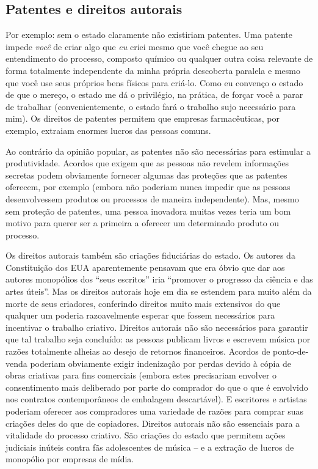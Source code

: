 \subsection*{Patentes e direitos autorais}

Por exemplo: sem o estado claramente não existiriam patentes. Uma patente impede \emph{você} de criar algo que \emph{eu} criei mesmo que você chegue ao seu entendimento do processo, composto químico ou qualquer outra coisa relevante de forma totalmente independente da minha própria descoberta paralela e mesmo que você use seus próprios bens físicos para criá-lo. Como eu convenço o estado de que o mereço, o estado me dá o privilégio, na prática, de forçar você a parar de trabalhar (convenientemente, o estado fará o trabalho sujo necessário para mim). Os direitos de patentes permitem que empresas farmacêuticas, por exemplo, extraiam enormes lucros das pessoas comuns.

Ao contrário da opinião popular, as patentes não são necessárias para estimular a produtividade. Acordos que exigem que as pessoas não revelem informações secretas podem obviamente fornecer algumas das proteções que as patentes oferecem, por exemplo (embora não poderiam nunca impedir que as pessoas desenvolvessem produtos ou processos de maneira independente). Mas, mesmo sem proteção de patentes, uma pessoa inovadora muitas vezes teria um bom motivo para querer ser a primeira a oferecer um determinado produto ou processo.

Os direitos autorais também são criações fiduciárias do estado. Os autores da Constituição dos EUA aparentemente pensavam que era óbvio que dar aos autores monopólios dos ``seus escritos'' iria ``promover o progresso da ciência e das artes úteis''. Mas os direitos autorais hoje em dia se estendem para muito além da morte de seus criadores, conferindo direitos muito mais extensivos do que qualquer um poderia razoavelmente esperar que fossem necessários para incentivar o trabalho criativo. Direitos autorais não são necessários para garantir que tal trabalho seja concluído: as pessoas publicam livros e escrevem música por razões totalmente alheias ao desejo de retornos financeiros. Acordos de ponto-de-venda poderiam obviamente exigir indenização por perdas devido à cópia de obras criativas para fins comerciais (embora estes precisariam envolver o consentimento mais deliberado por parte do comprador do que o que é envolvido nos contratos contemporâneos de embalagem descartável). E escritores e artistas poderiam oferecer aos compradores uma variedade de razões para comprar suas criações deles do que de copiadores. Direitos autorais não são essenciais para a vitalidade do processo criativo. São criações do estado que permitem ações judiciais inúteis contra fãs adolescentes de música -- e a extração de lucros de monopólio por empresas de mídia.

